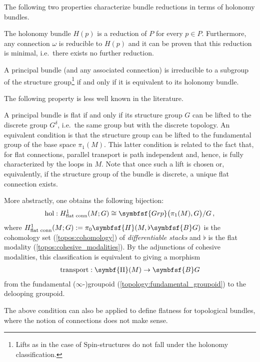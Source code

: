     The following two properties characterize bundle reductions in terms of holonomy bundles.
    \begin{property}
        The holonomy bundle $H(p)$ is a reduction of $P$ for every $p\in P$. Furthermore, any connection $\omega$ is reducible to $H(p)$ and it can be proven that this reduction is minimal, i.e.~there exists no further reduction.
    \end{property}
    \begin{result}\label{bundle:reducible_holonomy}
        A principal bundle (and any associated connection) is irreducible to a subgroup of the structure group\footnote{Lifts as in the case of $\mathrm{Spin}$-structures do not fall under the holonomy classification.} if and only if it is equivalent to its holonomy bundle.
    \end{result}

    The following property is less well known in the literature.
    \begin{property}\label{bundle:flat_connection_cohomology}
        A principal bundle is flat if and only if its structure group $G$ can be lifted to the discrete group $G^\delta$, i.e.~the same group but with the discrete topology. An equivalent condition is that the structure group can be lifted to the fundamental group of the base space $\pi_1(M)$. This latter condition is related to the fact that, for flat connections, parallel transport is path independent and, hence, is fully characterized by the loops in $M$. Note that once such a lift is chosen or, equivalently, if the structure group of the bundle is discrete, a unique flat connection exists.

        More abstractly, one obtains the following bijection:
        \begin{gather}
            \mathrm{hol}:H_{\text{flat conn}}^1(M;G)\cong\symbfsf{Grp}\bigl(\pi_1(M),G\bigr)/G\,,
        \end{gather}
        where $H_{\text{flat conn}}^1(M;G):=\pi_0\symbfsf{H}(M,\flat\symbfsf{B}G)$ is the cohomology set (\cref{topos:cohomology}) of \textit{differentiable stacks} and $\flat$ is the flat modality (\cref{topos:cohesive_modalities}). By the adjunctions of cohesive modalities, this classification is equivalent to giving a morphism
        \begin{gather}
            \mathrm{transport}:\symbf{\Pi}(M)\rightarrow\symbfsf{B}G
        \end{gather}
        from the fundamental ($\infty$-)groupoid (\cref{topology:fundamental_groupoid}) to the delooping groupoid.
    \end{property}
    \begin{remark}
        The above condition can also be applied to define flatness for topological bundles, where the notion of connections does not make sense.
    \end{remark}

